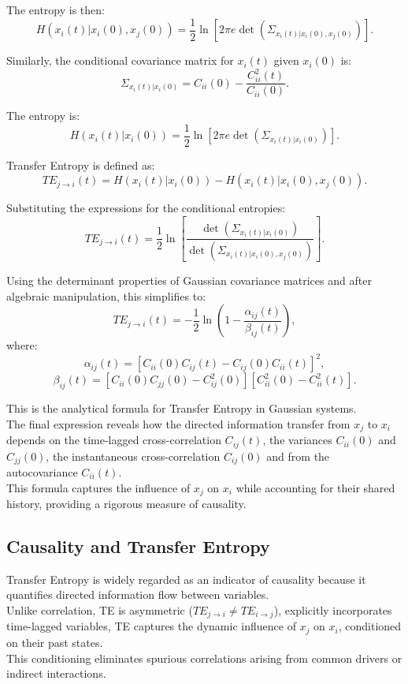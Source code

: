 \documentclass[English, Lau, oneside]{sapthesis}
\begin{document}
The entropy is then:
\[
H(x_i(t) | x_i(0), x_j(0)) = \frac{1}{2} \ln{[2\pi e \det\left(\Sigma_{x_i(t) | x_i(0), x_j(0)}\right)]}.
\]

Similarly, the conditional covariance matrix for \(x_i(t)\) given \(x_i(0)\) is:
\[
\Sigma_{x_i(t) | x_i(0)} = C_{ii}(0) - \frac{C_{ii}^2(t)}{C_{ii}(0)}.
\]

The entropy is:
\[
H(x_i(t) | x_i(0)) = \frac{1}{2} \ln{[2\pi e \det\left(\Sigma_{x_i(t) | x_i(0)}\right)]}.
\]


Transfer Entropy is defined as:
\[
TE_{j \to i}(t) = H(x_i(t) | x_i(0)) - H(x_i(t) | x_i(0), x_j(0)).
\]

Substituting the expressions for the conditional entropies:
\[
TE_{j \to i}(t) = \frac{1}{2} \ln{[\frac{\det{(\Sigma_{x_i(t) | x_i(0)})}}{\det{(\Sigma_{x_i(t) | x_i(0), x_j(0)})}}]}.
\]

Using the determinant properties of Gaussian covariance matrices and after algebraic manipulation, this simplifies to:
\[
TE_{j \to i}(t) = -\frac{1}{2} \ln {(1 - \frac{\alpha_{ij}(t)}{\beta_{ij}(t)})},
\]
where:
\[
\alpha_{ij}(t) = \left[C_{ii}(0)C_{ij}(t) - C_{ij}(0)C_{ii}(t)\right]^2,
\]
\[
\beta_{ij}(t) = \left[C_{ii}(0)C_{jj}(0) - C_{ij}^2(0)\right]\left[C_{ii}^2(0) - C_{ii}^2(t)\right].
\]

This is the analytical formula for Transfer Entropy in Gaussian systems.\\
The final expression reveals how the directed information transfer from \(x_j\) to \(x_i\) depends on the time-lagged cross-correlation \(C_{ij}(t)\), the variances \(C_{ii}(0)\) and \(C_{jj}(0)\), the instantaneous cross-correlation \(C_{ij}(0)\) and from the autocovariance \(C_{ii}(t)\).\\
This formula captures the influence of \(x_j\) on \(x_i\) while accounting for their shared history, providing a rigorous measure of causality.

\subsection{Causality and Transfer Entropy}
\noindent Transfer Entropy is widely regarded as an indicator of causality because it quantifies directed information flow between variables. \\
Unlike correlation, TE is asymmetric (\(TE_{j \to i} \neq TE_{i \to j}\)), explicitly incorporates time-lagged variables, TE captures the dynamic influence of \(x_j\) on \(x_i\), conditioned on their past states. \\
This conditioning eliminates spurious correlations arising from common drivers or indirect interactions.
\end{document}
